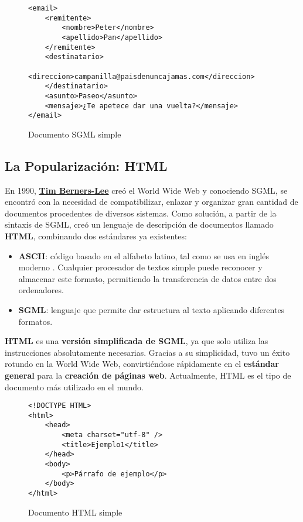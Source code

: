 \begin{figure}[h]
    \begin{tcolorbox}[sharp corners, colback=yellow!30, colframe=white!20]
      \scriptsize
      \begin{verbatim}
<email>
    <remitente>
        <nombre>Peter</nombre>
        <apellido>Pan</apellido>
    </remitente>
    <destinatario>
        <direccion>campanilla@paisdenuncajamas.com</direccion>
    </destinatario>
    <asunto>Paseo</asunto>
    <mensaje>¿Te apetece dar una vuelta?</mensaje>
</email>
      \end{verbatim}
    \end{tcolorbox}
\caption{Documento SGML simple}
\end{figure}

\subsection{La Popularización: HTML}

En 1990, \href{https://es.wikipedia.org/wiki/Tim_Berners-Lee}{\textbf{Tim Berners-Lee}} creó el World Wide Web y conociendo SGML, se encontró con la necesidad de compatibilizar, enlazar y organizar gran cantidad de documentos procedentes de diversos sistemas. Como solución, a partir de la sintaxis de SGML, creó un lenguaje de descripción de documentos llamado \textbf{\gls{HTML}}, combinando dos estándares ya existentes:

\begin{itemize}
    \item \textbf{\gls{ASCII}}: código basado en el alfabeto latino, tal como se usa en inglés moderno \cite{ascii}. Cualquier procesador de textos simple puede reconocer y almacenar este formato, permitiendo la transferencia de datos entre dos ordenadores.
    \item \textbf{SGML}: lenguaje que permite dar estructura al texto aplicando diferentes formatos.
\end{itemize}

\textbf{HTML} es una \textbf{versión simplificada de SGML}, ya que solo utiliza las instrucciones absolutamente necesarias. Gracias a su simplicidad, tuvo un éxito rotundo en la World Wide Web, convirtiéndose rápidamente en el \textbf{estándar general} para la \textbf{creación de páginas web}. Actualmente, HTML es el tipo de documento más utilizado en el mundo.

\begin{figure}[h]
    \begin{tcolorbox}[sharp corners, colback=yellow!30, colframe=white!20]
        \scriptsize
        \begin{verbatim}
<!DOCTYPE HTML>
<html>
    <head>
        <meta charset="utf-8" />
        <title>Ejemplo1</title>
    </head>
    <body>
        <p>Párrafo de ejemplo</p>
    </body>
</html>
        \end{verbatim}
    \end{tcolorbox}
    \caption{Documento HTML simple}
\end{figure}

